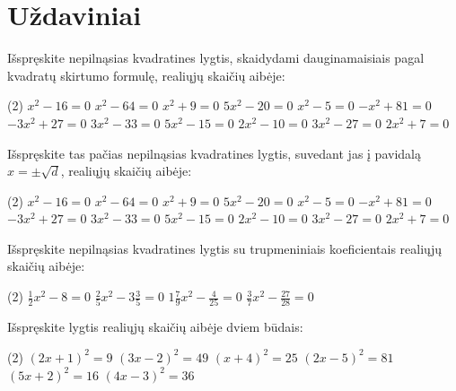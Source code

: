 \documentclass[11pt,a4paper]{scrartcl}
\begin{document}
\section{Uždaviniai}

\begin{problem}
Išspręskite nepilnąsias kvadratines lygtis, skaidydami dauginamaisiais pagal kvadratų skirtumo formulę, realiųjų skaičių aibėje:
\begin{tasks}[label={(\arabic*)}, label-offset=0.9em](2)
    \task $x^2-16=0$
    \task $x^2-64=0$
    \task $x^2 + 9 = 0$
    \task $5x^2-20=0$
    \task $x^2 - 5 = 0$
    \task $-x^2 + 81 = 0$
    \task $-3x^2 + 27 = 0$
    \task $3x^2 - 33 = 0$
    \task $5x^2 - 15 = 0$
    \task $2x^2 - 10 = 0$
    \task $3x^2-27=0$
    \task $2x^2 + 7 = 0$
\end{tasks}
\end{problem}

\begin{problem}
Išspręskite tas pačias nepilnąsias kvadratines lygtis, suvedant jas į pavidalą $x = \pm\sqrt{d}$, realiųjų skaičių aibėje:
\begin{tasks}[label={(\arabic*)}, label-offset=0.9em](2)
    \task $x^2-16=0$
    \task $x^2-64=0$
    \task $x^2 + 9 = 0$
    \task $5x^2-20=0$
    \task $x^2 - 5 = 0$
    \task $-x^2 + 81 = 0$
    \task $-3x^2 + 27 = 0$
    \task $3x^2 - 33 = 0$
    \task $5x^2 - 15 = 0$
    \task $2x^2 - 10 = 0$
    \task $3x^2-27=0$
    \task $2x^2 + 7 = 0$
\end{tasks}
\end{problem}

\begin{problem}
Išspręskite nepilnąsias kvadratines lygtis su trupmeniniais koeficientais realiųjų skaičių aibėje:
\begin{tasks}[label={(\arabic*)}, label-offset=0.9em](2)
    \task $\frac{1}{2}x^2 - 8 = 0$
    \task $\frac{2}{5}x^2 - 3\frac{3}{5} = 0$
    \task $1\frac{7}{9}x^2 - \frac{4}{25} = 0$
    \task $\frac{3}{7}x^2 - \frac{27}{28} = 0$
\end{tasks}
\end{problem}

\begin{problem}
Išspręskite lygtis realiųjų skaičių aibėje dviem būdais:
\begin{tasks}[label={(\arabic*)}, label-offset=0.9em](2)
    \task $(2x+1)^2=9$
    \task $(3x-2)^2=49$
    \task $(x+4)^2=25$
    \task $(2x-5)^2=81$
    \task $(5x+2)^2=16$
    \task $(4x-3)^2=36$
\end{tasks}
\end{problem}
\end{document}
